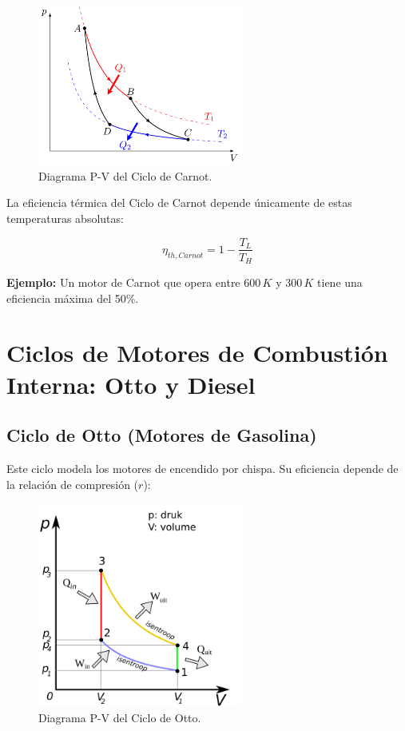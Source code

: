 \documentclass{article}
\begin{document}
\begin{figure}[h!]
    \centering
    \includegraphics[width=0.6\textwidth]{img/diagrama_pv_ciclo_carnot.png}
    \caption{Diagrama P-V del Ciclo de Carnot.}
    \label{fig:carnot_cycle}
\end{figure}


La eficiencia térmica del Ciclo de Carnot depende únicamente de estas temperaturas absolutas:

$$ \eta_{th,Carnot} = 1 - \frac{T_L}{T_H} $$

\textbf{Ejemplo:} Un motor de Carnot que opera entre $600 \, K$ y $300 \, K$ tiene una eficiencia máxima del 50\%.

\section*{Ciclos de Motores de Combustión Interna: Otto y Diesel}

\subsection*{Ciclo de Otto (Motores de Gasolina)}

Este ciclo modela los motores de encendido por chispa. Su eficiencia depende de la relación de compresión ($r$):

\begin{figure}[h!]
    \centering
    \includegraphics[width=0.6\textwidth]{img/diagrama_pv_ciclo_otto.png}
    \caption{Diagrama P-V del Ciclo de Otto.}
    \label{fig:otto_cycle}
\end{figure}
\end{document}
